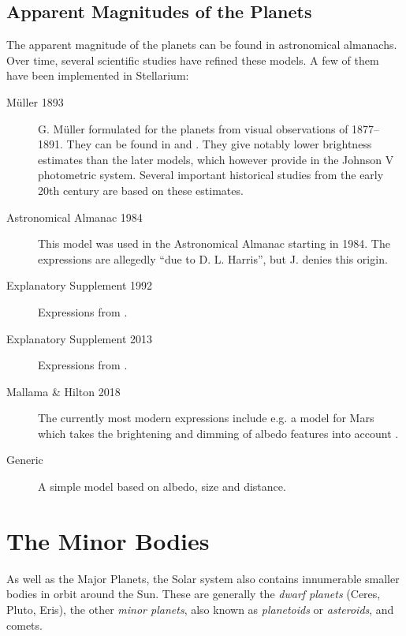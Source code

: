 \subsection{Apparent Magnitudes of the Planets}
The apparent magnitude of the planets can be found in astronomical
almanachs. Over time, several scientific studies have refined these
models. A few of them have been implemented in Stellarium:
\begin{description}
\item[M\"uller 1893] G. M\"uller formulated
   for the
  planets from visual observations of 1877--1891. They can be found in
  \citet{AstronomicalAlgorithms:1998} and \citet{ESAE:1961}. They give 
  notably lower brightness estimates than the later models, which however 
  provide 
  in the Johnson V photometric system. Several important 
  historical studies from the early 20th century are based on these estimates.
\item[Astronomical Almanac 1984] This model was used in the
  Astronomical Almanac starting in 1984. The expressions are allegedly
  ``due to D. L.  Harris'', but J.
  \citet[p.286]{AstronomicalAlgorithms:1998} denies this origin. 
\item[Explanatory Supplement 1992] Expressions from \citet{ESAA:1992}.
\item[Explanatory Supplement 2013] Expressions from \citet{ESAA:2013}.
\item[Mallama \& Hilton 2018] The currently most modern expressions
  include e.g. a model for Mars which takes the brightening and
  dimming of albedo features into account \citep{Mallama:2018}.
\item[Generic] A simple model based on albedo, size and distance.
\end{description}

\section{The Minor Bodies}%

As well as the Major Planets, the Solar system also contains
innumerable smaller bodies in orbit around the Sun. These are
generally the \emph{dwarf planets} (Ceres, Pluto, Eris), the other
\emph{minor planets}, also known as \emph{planetoids} or
\emph{asteroids}, and comets.

